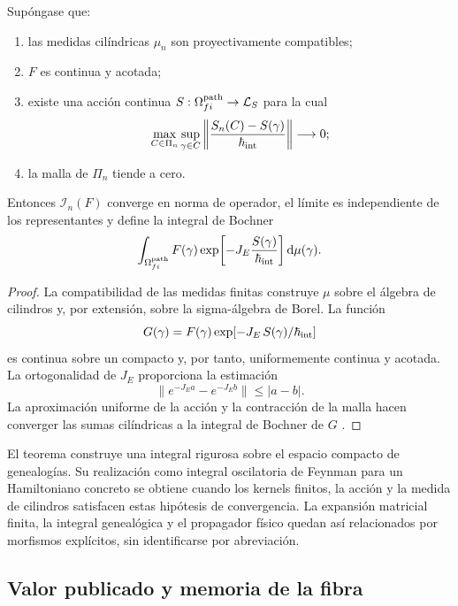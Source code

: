 \begin{theorem}
\label{thm:integral-genealogica-caminos-rev2}
Supóngase que:
\begin{enumerate}
 \item las medidas cilíndricas \(\mu_n\) son proyectivamente compatibles;
 \item \(F\) es continua y acotada;
 \item existe una acción continua
 \(S:\Omega^{\rm path}_{fi}\to\mathcal L_S\) para la cual
 \[
  \max_{C\in\Pi_n}\sup_{\gamma\in C}
  \left\|\frac{S_n(C)-S(\gamma)}{\hbar_{\rm int}}\right\|
  \longrightarrow0;
 \]
 \item la malla de \(\Pi_n\) tiende a cero.
\end{enumerate}
Entonces \(\mathcal I_n(F)\) converge en norma de operador, el límite es
independiente de los representantes y define la integral de Bochner
\begin{equation}
 \int_{\Omega^{\rm path}_{fi}}
 F(\gamma)
 \exp\!\left[-J_E\frac{S(\gamma)}{\hbar_{\rm int}}\right]
 \mathrm d\mu(\gamma).
 \label{eq:integral-genealogica-caminos-rev2}
\end{equation}
\end{theorem}

\begin{proof}
La compatibilidad de las medidas finitas construye \(\mu\) sobre el álgebra
de cilindros y, por extensión, sobre la sigma-álgebra de Borel. La función
\[
 G(\gamma)=F(\gamma)
 \exp[-J_E\,S(\gamma)/\hbar_{\rm int}]
\]
es continua sobre un compacto y, por tanto, uniformemente continua y
acotada. La ortogonalidad de \(J_E\) proporciona la estimación
\[
 \|e^{-J_E a}-e^{-J_E b}\|\leq |a-b|.
\]
La aproximación uniforme de la acción y la contracción de la malla hacen
converger las sumas cilíndricas a la integral de Bochner de \(G\)
\cite{Bochner1955}.
\end{proof}

El teorema construye una integral rigurosa sobre el espacio compacto de
genealogías. Su realización como integral oscilatoria de Feynman para un
Hamiltoniano concreto se obtiene cuando los kernels finitos, la acción y la
medida de cilindros satisfacen estas hipótesis de convergencia. La expansión
matricial finita, la integral genealógica y el propagador físico quedan así
relacionados por morfismos explícitos, sin identificarse por abreviación.

\subsection{Valor publicado y memoria de la fibra}

